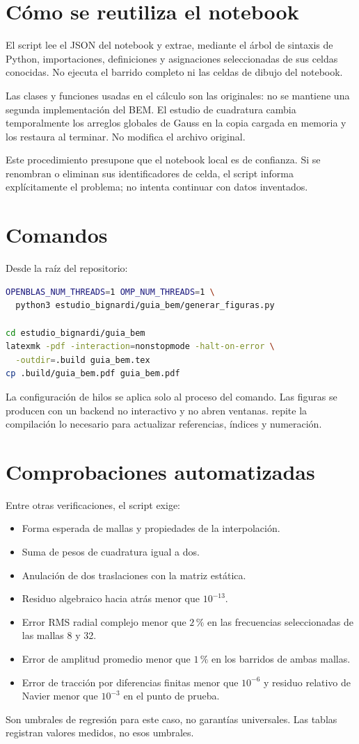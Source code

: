 \documentclass[11pt,a4paper]{report}
\numberwithin{equation}{chapter}
\DeclareRobustCommand{\code}[1]{\texttt{\detokenize{#1}}}
\begin{document}
\section{C\'omo se reutiliza el notebook}
El script lee el JSON del notebook y extrae, mediante el \'arbol de
sintaxis de Python, importaciones, definiciones y asignaciones
seleccionadas de sus celdas conocidas. No ejecuta el barrido completo
ni las celdas de dibujo del notebook.

Las clases y funciones usadas en el c\'alculo son las originales:
no se mantiene una segunda implementaci\'on del BEM. El estudio de
cuadratura cambia temporalmente los arreglos globales de Gauss en la
copia cargada en memoria y los restaura al terminar. No modifica
el archivo original.

Este procedimiento presupone que el notebook local es de confianza.
Si se renombran o eliminan sus identificadores de celda, el script
informa expl\'icitamente el problema; no intenta continuar con datos
inventados.

\section{Comandos}
Desde la ra\'iz del repositorio:
\begin{lstlisting}[language=bash]
OPENBLAS_NUM_THREADS=1 OMP_NUM_THREADS=1 \
  python3 estudio_bignardi/guia_bem/generar_figuras.py

cd estudio_bignardi/guia_bem
latexmk -pdf -interaction=nonstopmode -halt-on-error \
  -outdir=.build guia_bem.tex
cp .build/guia_bem.pdf guia_bem.pdf
\end{lstlisting}
La configuraci\'on de hilos se aplica solo al proceso del comando.
Las figuras se producen con un backend no interactivo y no abren
ventanas. \code{latexmk} repite la compilaci\'on lo necesario para
actualizar referencias, \'indices y numeraci\'on.

\section{Comprobaciones automatizadas}
Entre otras verificaciones, el script exige:
\begin{itemize}
 \item Forma esperada de mallas y propiedades de la interpolaci\'on.
 \item Suma de pesos de cuadratura igual a dos.
 \item Anulaci\'on de dos traslaciones con la matriz est\'atica.
 \item Residuo algebraico hacia atr\'as menor que $10^{-13}$.
 \item Error RMS radial complejo menor que $2\,\%$ en las frecuencias
 seleccionadas de las mallas 8 y 32.
 \item Error de amplitud promedio menor que $1\,\%$ en los barridos
 de ambas mallas.
 \item Error de tracci\'on por diferencias finitas menor que $10^{-6}$
 y residuo relativo de Navier menor que $10^{-3}$ en el punto de prueba.
\end{itemize}
Son umbrales de regresi\'on para este caso, no garant\'ias universales.
Las tablas registran valores medidos, no esos umbrales.
\end{document}
